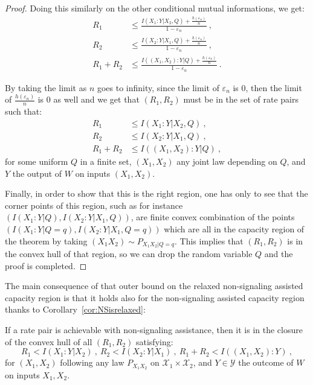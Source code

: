 \begin{proof}
    Doing this similarly on the other conditional mutual informations, we get:
    \begin{equation}
      \begin{aligned}
        R_1 &\leq \frac{I(X_1:Y|X_2,Q)+\frac{h(\varepsilon_n)}{n}}{1-\varepsilon_n}\ ,\\
        R_2 &\leq \frac{I(X_2:Y|X_1,Q)+\frac{h(\varepsilon_n)}{n}}{1-\varepsilon_n} \ ,\\
        R_1+R_2 &\leq  \frac{I((X_1,X_2):Y|Q)+\frac{h(\varepsilon_n)}{n}}{1-\varepsilon_n} \ .
      \end{aligned}
    \end{equation}

    By taking the limit as $n$ goes to infinity, since the limit of $\varepsilon_n$ is $0$, then the limit of $\frac{h(\varepsilon_n)}{n}$ is $0$ as well and we get that $(R_1,R_2)$ must be in the set of rate pairs such that:
    \begin{equation}
      \begin{aligned}
        R_1 &\leq I(X_1:Y|X_2,Q) \ ,\\
        R_2 &\leq I(X_2:Y|X_1,Q) \ ,\\
        R_1+R_2 &\leq I((X_1,X_2):Y|Q) \ ,
      \end{aligned}
    \end{equation}
    for some uniform $Q$ in a finite set, $(X_1,X_2)$ any joint law depending on $Q$, and $Y$ the output of $W$ on inputs $(X_1,X_2)$.

    Finally, in order to show that this is the right region, one has only to see that the corner points of this region, such as for instance $(I(X_1:Y|Q),I(X_2:Y|X_1,Q))$, are finite convex combination of the points $(I(X_1:Y|Q=q),I(X_2:Y|X_1,Q=q))$ which are all in the capacity region of the theorem by taking $(X_1X_2) \sim P_{X_1X_2|Q=q}$. This implies that $(R_1,R_2)$ is in the convex hull of that region, so we can drop the random variable $Q$ and the proof is completed.
      \end{proof}

      The main consequence of that outer bound on the relaxed non-signaling assisted capacity region is that it holds also for the non-signaling assisted capacity region thanks to Corollary~\ref{cor:NSisrelaxed}:

      \begin{corollary}
        \label{cor:OB}
        If a rate pair is achievable with non-signaling assistance, then it is in the closure of the convex hull of all $(R_1,R_2)$ satisfying:
        \[ R_1 < I(X_1:Y|X_2)\ ,\ R_2 < I(X_2:Y|X_1)\ ,\ R_1+R_2 < I((X_1,X_2):Y) \ ,\]
        for $(X_1,X_2)$ following any law $P_{X_1X_2}$ on $\mathcal{X}_1 \times \mathcal{X}_2$, and $Y \in \mathcal{Y}$ the outcome of $W$ on inputs $X_1,X_2$.
      \end{corollary}

